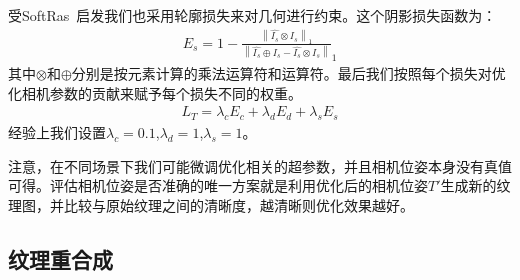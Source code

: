 受SoftRas~\cite{ShichenLiu2019SoftRA}启发我们也采用轮廓损失来对几何进行约束。这个阴影损失函数为：
\begin{align}
	E_s = 1 - \frac{\left \| \hat{I_s}\otimes I_s  \right \|_1 }{\left \| \hat{I_s}\oplus  I_s- \hat{I_s}\otimes I_s \right \| }_1  
\end{align}
其中$\otimes $和$\oplus $分别是按元素计算的乘法运算符和运算符。最后我们按照每个损失对优化相机参数的贡献来赋予每个损失不同的权重。
\begin{align}
	L_T = \lambda_c E_c + \lambda_d E_d +\lambda_s E_s
\end{align}经验上我们设置$\lambda_c = 0.1$,$\lambda_d = 1$,$\lambda_s = 1$。\par
注意，在不同场景下我们可能微调优化相关的超参数，并且相机位姿本身没有真值可得。评估相机位姿是否准确的唯一方案就是利用优化后的相机位姿$T'$生成新的纹理图，并比较与原始纹理之间的清晰度，越清晰则优化效果越好。

\subsection{纹理重合成}



